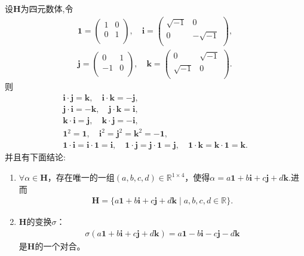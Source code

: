 \documentclass[../../main.tex]{subfiles}%
\begin{document}
\begin{proposition}\label{proposition:四元数体的基本结论----1}
设$\mathbf{H}$为四元数体,令
\begin{gather*}
\mathbf{1}=\left( \begin{matrix}
1&		0\\
0&		1\\
\end{matrix} \right) ,\quad \mathbf{i}=\left( \begin{matrix}
\sqrt{-1}&		0\\
0&		-\sqrt{-1}\\
\end{matrix} \right) ,
\\
\mathbf{j}=\left( \begin{matrix}
0&		1\\
-1&		0\\
\end{matrix} \right) ,\quad \mathbf{k}=\left( \begin{matrix}
0&		\sqrt{-1}\\
\sqrt{-1}&		0\\
\end{matrix} \right) .
\end{gather*}
则
\begin{gather*}
\mathbf{i}\cdot \mathbf{j}=\mathbf{k},\quad \mathbf{i}\cdot \mathbf{k}=-\mathbf{j},
\\
\mathbf{j}\cdot \mathbf{i}=-\mathbf{k},\quad \mathbf{j}\cdot \mathbf{k}=\mathbf{i},
\\
\mathbf{k}\cdot \mathbf{i}=\mathbf{j},\quad \mathbf{k}\cdot \mathbf{j}=-\mathbf{i},
\\
\mathbf{1}^2=\mathbf{1},\quad \mathbf{i}^2=\mathbf{j}^2=\mathbf{k}^2=-\mathbf{1},
\\
\mathbf{1}\cdot \mathbf{i}=\mathbf{i}\cdot \mathbf{1}=\mathbf{i},\quad \mathbf{1}\cdot \mathbf{j}=\mathbf{j}\cdot \mathbf{1}=\mathbf{j},\quad \mathbf{1}\cdot \mathbf{k}=\mathbf{k}\cdot \mathbf{1}=\mathbf{k}.
\end{gather*}
并且有下面结论:
\begin{enumerate}[(1)]
\item $\forall\alpha\in\mathbf{H}$，存在唯一的一组$(a,b,c,d)\in\mathbb{R}^{1\times4}$，使得$\alpha=a\mathbf{1}+b\mathbf{i}+c\mathbf{j}+d\mathbf{k}$.进而
\begin{align*}
\mathbf{H}=\{a\mathbf{1}+b\mathbf{i}+c\mathbf{j}+d\mathbf{k}\mid a,b,c,d\in \mathbb{R}\}.
\end{align*}

\item $\mathbf{H}$的变换$\sigma$：
\begin{align*}
\sigma(a\mathbf{1}+b\mathbf{i}+c\mathbf{j}+d\mathbf{k})=a\mathbf{1}-b\mathbf{i}-c\mathbf{j}-d\mathbf{k}
\end{align*}
是$\mathbf{H}$的一个对合。
\end{enumerate}
\end{proposition}
\end{document}
